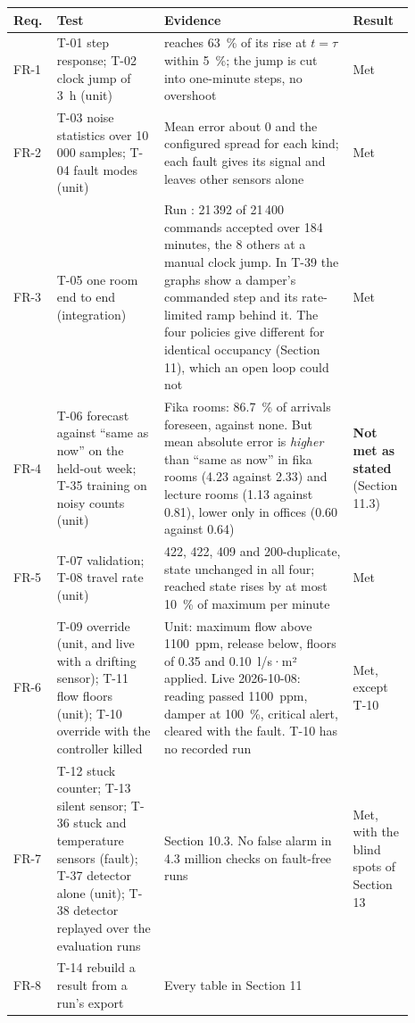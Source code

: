 \begin{longtable}[]{@{}L{0.07\linewidth}L{0.25\linewidth}L{0.44\linewidth}L{0.13\linewidth}@{}}
\toprule
\textbf{Req.} & \textbf{Test} & \textbf{Evidence} & \textbf{Result} \\
\midrule
\endhead
FR-1 & T-01 step response; T-02 clock jump of 3~h (unit) &
\COtwo{} reaches 63~\% of its rise at $t=\tau$ within 5~\%; the jump is cut into
one-minute steps, no overshoot & Met \\
FR-2 & T-03 noise statistics over 10\,000 samples; T-04 fault modes (unit) &
Mean error about 0 and the configured spread for each kind; each fault gives
its signal and leaves other sensors alone & Met \\
FR-3 & T-05 one room end to end (integration) & Run :
21\,392 of 21\,400 commands accepted over 184 minutes, the 8 others at a manual
clock jump. In T-39 the graphs show a damper's commanded step and its
rate-limited ramp behind it. The four policies give different \COtwo{} for
identical occupancy (Section 11), which an open loop could not & Met \\
FR-4 & T-06 forecast against ``same as now'' on the held-out week; T-35
training on noisy counts (unit) & Fika rooms: 86.7~\% of arrivals foreseen,
against none. But mean absolute error is \emph{higher} than ``same as now'' in
fika rooms (4.23 against 2.33) and lecture rooms (1.13 against 0.81), lower
only in offices (0.60 against 0.64) & \textbf{Not met as stated} (Section 11.3) \\
FR-5 & T-07 validation; T-08 travel rate (unit) & 422, 422, 409 and
200-duplicate, state unchanged in all four; reached state rises by at most
10~\% of maximum per minute & Met \\
FR-6 & T-09 override (unit, and live with a drifting sensor); T-11 flow floors
(unit); T-10 override with the controller killed & Unit: maximum flow above
1100~ppm, release below, floors of 0.35 and 0.10~l/s·m² applied. Live
2026-10-08: reading passed 1100~ppm, damper at 100~\%, critical alert, cleared
with the fault. T-10 has no recorded run & Met, except T-10 \\
FR-7 & T-12 stuck counter; T-13 silent \COtwo{} sensor; T-36 stuck \COtwo{}
and temperature sensors (fault); T-37 detector alone (unit); T-38 detector
replayed over the evaluation runs & Section 10.3. No false alarm in 4.3
million checks on fault-free runs & Met, with the blind spots of Section 13 \\
FR-8 & T-14 rebuild a result from a run's export & Every table in Section 11

\end{longtable}
